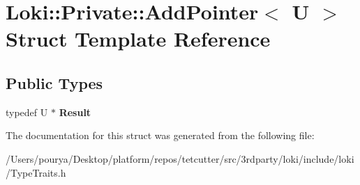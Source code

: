 \hypertarget{structLoki_1_1Private_1_1AddPointer}{}\section{Loki\+:\+:Private\+:\+:Add\+Pointer$<$ U $>$ Struct Template Reference}
\label{structLoki_1_1Private_1_1AddPointer}
\subsection*{Public Types}
\begin{DoxyCompactItemize}
\item 
\hypertarget{structLoki_1_1Private_1_1AddPointer_a0c7a7496e23cc21c82c7190bbb14a222}{}typedef U $\ast$ {\bfseries Result}\label{structLoki_1_1Private_1_1AddPointer_a0c7a7496e23cc21c82c7190bbb14a222}

\end{DoxyCompactItemize}


The documentation for this struct was generated from the following file\+:\begin{DoxyCompactItemize}
\item 
/\+Users/pourya/\+Desktop/platform/repos/tetcutter/src/3rdparty/loki/include/loki/Type\+Traits.\+h\end{DoxyCompactItemize}
